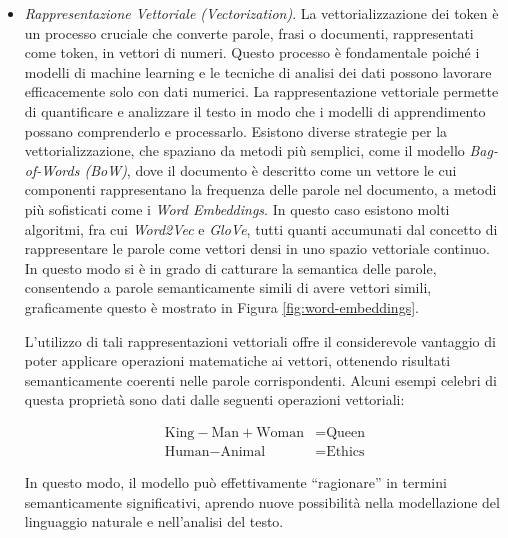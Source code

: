 \documentclass[12pt,a4paper,twoside,openright]{book}
\begin{document}
\begin{itemize}
    \item \emph{Rappresentazione Vettoriale (Vectorization)}. La vettorializzazione dei token è un processo cruciale che converte parole, frasi o documenti, rappresentati come token, in vettori di numeri. Questo processo è fondamentale poiché i modelli di machine learning e le tecniche di analisi dei dati possono lavorare efficacemente solo con dati numerici. La rappresentazione vettoriale permette di quantificare e analizzare il testo in modo che i modelli di apprendimento possano comprenderlo e processarlo. Esistono diverse strategie per la vettorializzazione, che spaziano da metodi più semplici, come il modello \emph{Bag-of-Words (BoW)}, dove il documento è descritto come un vettore le cui componenti rappresentano la frequenza delle parole nel documento, a metodi più sofisticati come i \emph{Word Embeddings}. In questo caso esistono molti algoritmi, fra cui \emph{Word2Vec}\cite{mikolov2013efficient} e \emph{GloVe}\cite{pennington-etal-2014-glove}, tutti quanti accumunati dal concetto di rappresentare le parole come vettori densi in uno spazio vettoriale continuo. In questo modo si è in grado di catturare la semantica delle parole, consentendo a parole semanticamente simili di avere vettori simili, graficamente questo è mostrato in Figura \ref{fig:word-embeddings}. 

    L'utilizzo di tali rappresentazioni vettoriali offre il considerevole vantaggio di poter applicare operazioni matematiche ai vettori, ottenendo risultati semanticamente coerenti nelle parole corrispondenti. Alcuni esempi celebri di questa proprietà sono dati dalle seguenti operazioni vettoriali:

    \begin{align*}
        \text{King} - \text{Man} + \text{Woman} &= \text{Queen} \\
        \text{Human} - \text{Animal} &= \text{Ethics}
    \end{align*}

    In questo modo, il modello può effettivamente ``ragionare'' in termini semanticamente significativi, aprendo nuove possibilità nella modellazione del linguaggio naturale e nell'analisi del testo.
    
\end{itemize}
\end{document}
